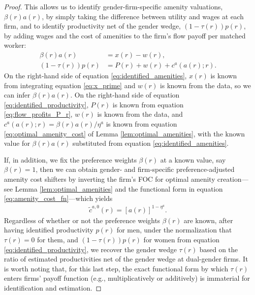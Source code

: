 \begin{proof}
    This allows us to identify gender-firm-specific amenity valuations, $\beta(r) a(r)$, by simply taking the difference between utility and wages at each firm, and to identify productivity net of the gender wedge, $(1 - \tau(r)) p(r)$, by adding wages and the cost of amenities to the firm's flow payoff per matched worker:
    \begin{align}
        \beta(r) a(r) &= x(r) - w(r), \label{eq:identified_amenities} \\
        (1 - \tau(r)) p(r) &= P(r) + w(r) + c^{a}(a(r); r). \label{eq:identified_productivity}
    \end{align}
    On the right-hand side of equation \eqref{eq:identified_amenities}, $x(r)$ is known from integrating equation \eqref{eq:x_prime} and $w(r)$ is known from the data, so we can infer $\beta(r) a(r)$. %
    On the right-hand side of equation \eqref{eq:identified_productivity}, $P(r)$ is known from equation \eqref{eq:flow_profits_P_r}, $w(r)$ is known from the data, and $c^{a}(a(r); r) = \beta(r) a(r) / \eta^{a}$ is known from equation \eqref{eq:optimal_amenity_cost} of Lemma \ref{lem:optimal_amenities}, with the known value for $\beta(r) a(r)$ substituted from equation \eqref{eq:identified_amenities}.

    If, in addition, we fix the preference weights $\beta(r)$ at a known value, say $\beta(r) = 1$, then we can obtain gender- and firm-specific preference-adjusted amenity cost shifters by inverting the firm's FOC for optimal amenity creation---see Lemma \ref{lem:optimal_amenities} and the functional form in equation \eqref{eq:amenity_cost_fn}---which yields
    \begin{align}
        \tilde{c}^{a,0}(r) = \left[ a(r) \right]^{1 - \eta^{a}}. \label{eq:identified_amenity_cost_shifter}
    \end{align}
    Regardless of whether or not the preference weights $\beta(r)$ are known, after having identified productivity $p(r)$ for men, under the normalization that $\tau(r) = 0$ for them, and $(1 - \tau(r))p(r)$ for women from equation \eqref{eq:identified_productivity}, we recover the gender wedge $\tau(r)$ based on the ratio of estimated productivities net of the gender wedge at dual-gender firms. It is worth noting that, for this last step, the exact functional form by which $\tau(r)$ enters firms' payoff function (e.g., multiplicatively or additively) is immaterial for identification and estimation.
\end{proof}


